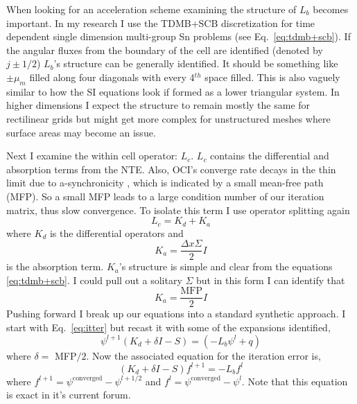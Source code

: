 When looking for an acceleration scheme examining the structure of $L_b$ becomes important.
In my research I use the TDMB+SCB discretization for time dependent single dimension multi-group Sn problems (see Eq.~\eqref{eq:tdmb+scb}).
If the angular fluxes from the boundary of the cell are identified (denoted by $j\pm1/2$) $L_b$'s structure can be generally identified.
It should be something like $\pm\mu_m$ filled along four diagonals with every 4$^{th}$ space filled.
This is also vaguely similar to how the SI equations look if formed as a lower triangular system.
In higher dimensions I expect the structure to remain mostly the same for rectilinear grids but might get more complex for unstructured meshes where surface areas may become an issue.

Next I examine the within cell operator: $L_c$.
$L_c$ contains the differential and absorption terms from the NTE.
Also, OCI's converge rate decays in the thin limit due to a-synchronicity \cite{rosa_cellwise_2013, hoagland_hybrid_2021}, which is indicated by a small mean-free path (MFP).
So a small MFP leads to a large condition number of our iteration matrix, thus slow convergence.
To isolate this term I use operator splitting again
\begin{equation}
    L_c = K_d + K_a
\end{equation}
where $K_d$ is the differential operators and
\begin{equation}
    K_a = \frac{\Delta x \Sigma}{2}  I
\end{equation}
is the absorption term.
$K_a$'s structure is simple and clear from the equations \ref{eq:tdmb+scb}.
I could pull out a solitary $\Sigma$ but in this form I can identify that
\begin{equation}
    K_a = \frac{\text{MFP}}{2}  I
\end{equation}
Pushing forward I break up our equations into a standard synthetic approach.
I start with Eq.~\eqref{eq:itter} but recast it with some of the expansions identified,
\begin{equation}
    \psi^{l+1}(K_d + \delta I - S) = (-L_b\psi^l + q)
\end{equation}
where $\delta=$ MFP$/2$.
Now the associated equation for the iteration error is,
\begin{equation}
    (K_d + \delta I-S) f^{l+1} = -L_b f^l
\end{equation}
where $f^{l+1} = \psi^{\text{converged}}-\psi^{l+1/2}$ and $f^{l} = \psi^{\text{converged}}-\psi^{l}$.
Note that this equation is exact in it's current forum.
